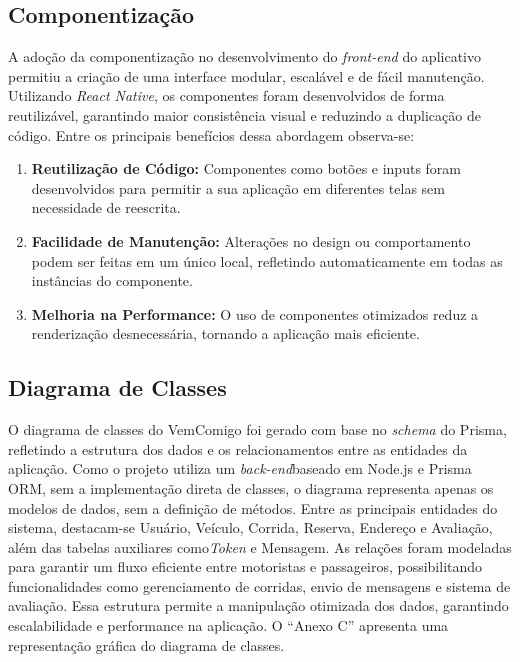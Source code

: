 \subsection{Componentização}

A adoção da componentização no desenvolvimento do \textit{front-end} do aplicativo permitiu a criação de uma interface modular, escalável e de fácil manutenção. Utilizando \textit{React Native}, os componentes foram desenvolvidos de forma reutilizável, garantindo maior consistência visual e reduzindo a duplicação de código. Entre os principais benefícios dessa abordagem observa-se:

\begin{enumerate}
	\item \textbf{Reutilização de Código:} Componentes como botões e inputs foram desenvolvidos para permitir a sua aplicação em diferentes telas sem necessidade de reescrita.
	\item \textbf{Facilidade de Manutenção:} Alterações no design ou comportamento podem ser feitas em um único local, refletindo automaticamente em todas as instâncias do componente.
	\item \textbf{Melhoria na Performance:} O uso de componentes otimizados reduz a renderização desnecessária, tornando a aplicação mais eficiente.
\end{enumerate}

\subsection{Diagrama de Classes}

O diagrama de classes do VemComigo foi gerado com base no \textit{schema} do Prisma, refletindo a estrutura dos dados e os relacionamentos entre as entidades da aplicação. Como o projeto utiliza um \textit{back-end}baseado em Node.js e Prisma ORM, sem a implementação direta de classes, o diagrama representa apenas os modelos de dados, sem a definição de métodos. Entre as principais entidades do sistema, destacam-se Usuário, Veículo, Corrida, Reserva, Endereço e Avaliação, além das tabelas auxiliares como\textit{Token} e Mensagem. As relações foram modeladas para garantir um fluxo eficiente entre motoristas e passageiros, possibilitando funcionalidades como gerenciamento de corridas, envio de mensagens e sistema de avaliação. Essa estrutura permite a manipulação otimizada dos dados, garantindo escalabilidade e performance na aplicação. O ``Anexo C'' apresenta uma representação gráfica do diagrama de classes.

